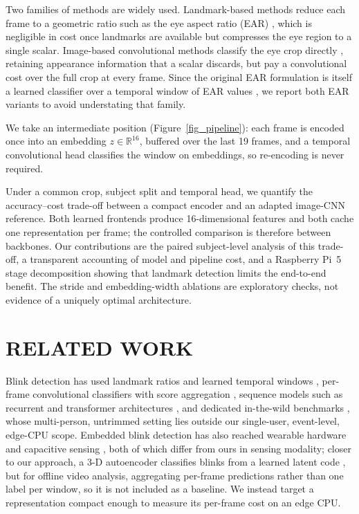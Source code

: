 \documentclass{IEEEmce}
\begin{document}
Two families of methods are widely used. Landmark-based methods reduce each frame to a
geometric ratio such as the eye aspect ratio (EAR) \cite{soukupova2016}, which is
negligible in cost once landmarks are available but compresses the eye region to a
single scalar. Image-based convolutional methods classify the eye crop directly
\cite{daza2020,daza2024}, retaining appearance information that a scalar discards, but
pay a convolutional cost over the full crop at every frame. Since the original EAR
formulation is itself a learned classifier over a temporal window of EAR values
\cite{soukupova2016}, we report both EAR variants to avoid understating that family.

We take an intermediate position (Figure~\ref{fig_pipeline}): each frame is encoded once
into an embedding $z \in \mathbb{R}^{16}$, buffered over the last 19 frames, and a
temporal convolutional head classifies the window on embeddings, so re-encoding is never
required.

Under a common crop, subject split and temporal head, we quantify the accuracy--cost
trade-off between a compact encoder and an adapted image-CNN reference. Both learned
frontends produce 16-dimensional features and both cache one representation per frame;
the controlled comparison is therefore between backbones. Our contributions are the
paired subject-level analysis of this trade-off, a transparent accounting of model and
pipeline cost, and a Raspberry Pi~5 stage decomposition showing that landmark detection
limits the end-to-end benefit. The stride and embedding-width ablations are exploratory
checks, not evidence of a uniquely optimal architecture.

\section{RELATED WORK}

Blink detection has used landmark ratios and learned temporal windows
\cite{soukupova2016}, per-frame convolutional classifiers with score aggregation
\cite{daza2020}, sequence models such as recurrent and transformer architectures
\cite{daza2024,fodor2023}, and dedicated in-the-wild benchmarks \cite{hu2019,zeng2023},
whose multi-person, untrimmed setting lies outside our single-user, event-level,
edge-CPU scope. Embedded blink detection has also reached wearable hardware
\cite{arcaya2021} and capacitive sensing \cite{capacitive2024}, both of which differ
from ours in sensing modality; closer to our approach, a 3-D autoencoder classifies
blinks from a learned latent code \cite{nousias2025}, but for offline video analysis,
aggregating per-frame predictions rather than one label per window, so it is not
included as a baseline. We instead target a representation compact enough to measure its
per-frame cost on an edge CPU.
\end{document}
